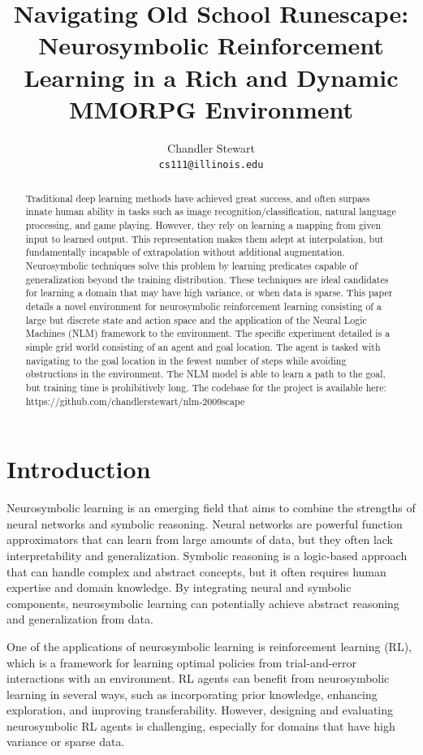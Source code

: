 \documentclass{article}
\title{Navigating Old School Runescape: Neurosymbolic Reinforcement Learning in a Rich and Dynamic MMORPG Environment}
\author{%
  Chandler Stewart \\
  \texttt{cs111@illinois.edu} \\
}
\begin{document}
\maketitle


\begin{abstract}
  Traditional deep learning methods have achieved great success, and often surpass innate human ability in tasks such as image recognition/classification, natural language processing, and game playing. However, they rely on learning a mapping from given input to learned output. This representation makes them adept at interpolation, but fundamentally incapable of extrapolation without additional augmentation. Neurosymbolic techniques solve this problem by learning predicates capable of generalization beyond the training distribution. These techniques are ideal candidates for learning a domain that may have high variance, or when data is sparse. This paper details a novel environment for neurosymbolic reinforcement learning consisting of a large but discrete state and action space and the application of the Neural Logic Machines (NLM) framework to the environment. The specific experiment detailed is a simple grid world consisting of an agent and goal location. The agent is tasked with navigating to the goal location in the fewest number of steps while avoiding obstructions in the environment. The NLM model is able to learn a path to the goal, but training time is prohibitively long. The codebase for the project is available here:  https://github.com/chandlerstewart/nlm-2009scape
\end{abstract}


\section{Introduction}


Neurosymbolic learning is an emerging field that aims to combine the strengths of neural networks and symbolic reasoning. Neural networks are powerful function approximators that can learn from large amounts of data, but they often lack interpretability and generalization. Symbolic reasoning is a logic-based approach that can handle complex and abstract concepts, but it often requires human expertise and domain knowledge. By integrating neural and symbolic components, neurosymbolic learning can potentially achieve abstract reasoning and generalization from data.

One of the applications of neurosymbolic learning is reinforcement learning (RL), which is a framework for learning optimal policies from trial-and-error interactions with an environment. RL agents can benefit from neurosymbolic learning in several ways, such as incorporating prior knowledge, enhancing exploration, and improving transferability. However, designing and evaluating neurosymbolic RL agents is challenging, especially for domains that have high variance or sparse data.
\end{document}
